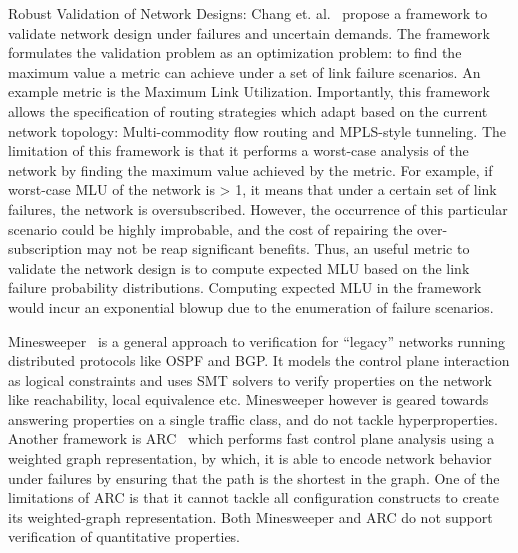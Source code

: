 \documentclass[]{article}
\begin{document}
Robust Validation of Network Designs: Chang et. al.~\cite{robustvalidation} propose a framework to validate network design under failures and uncertain demands. The framework formulates the validation problem as an optimization problem: to find the maximum value a metric can achieve under a set of link failure scenarios. An example metric is the Maximum Link Utilization. Importantly, this framework allows the specification of routing strategies which adapt based on the current network topology: Multi-commodity flow routing and MPLS-style tunneling. The limitation of this framework is that it performs a worst-case analysis of the network by finding the maximum value achieved by the metric. For example, if worst-case MLU of the network is > 1, it means that under a certain set of link failures, the network is oversubscribed. However, the occurrence of this particular scenario could be highly improbable, and the cost of repairing the over-subscription may not be reap significant benefits. Thus, an useful metric to validate the network design is to compute expected MLU based on the link failure probability distributions. Computing expected MLU in the framework would incur an exponential blowup due to the enumeration of failure scenarios.


Minesweeper~\cite{minesweeper} is a general approach to verification for “legacy” networks running distributed protocols like OSPF and BGP. It models the control plane interaction as logical constraints and uses SMT solvers to verify properties on the network like reachability, local equivalence etc. Minesweeper however is geared towards answering properties on a single traffic class, and do not tackle hyperproperties. Another framework is ARC~\cite{arc} which performs fast control plane analysis using a weighted graph representation, by which, it is able to encode network behavior under failures by ensuring that the path is the shortest in the graph. One of the limitations of ARC is that it cannot tackle all configuration constructs to create its weighted-graph representation. Both Minesweeper and ARC do not support verification of quantitative properties.
\end{document}
